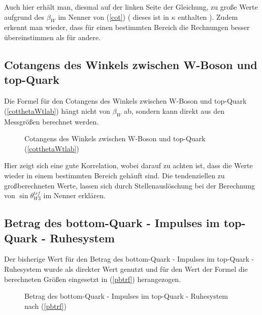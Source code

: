 \documentclass[
a4paper,                                %
twoside,                                %
BCOR1.4cm,                      %
ngerman,                                %
10pt,                           %
headings=normal,                %
headsepline,                    %
clearplainpage, %
final,                                  %
div=14,
parskip=full
]{scrbook}
\begin{document}
Auch hier erh\"alt man, diesmal auf der linken Seite der Gleichung, zu gro\ss e Werte aufgrund des $ \beta_{W} $ im Nenner von (\ref{cot}) ( dieses ist in $ \kappa $ enthalten ). Zudem erkennt man wieder, dass f\"ur einen bestimmten Bereich die Rechnungen besser \"ubereinstimmen als f\"ur andere.

\newpage

\subsection{Cotangens des Winkels zwischen W-Boson und top-Quark}

Die Formel f\"ur den Cotangens des Winkels zwischen W-Boson und top-Quark (\ref{cotthetaWtlab}) h\"angt nicht von $ \beta_{W} $ ab, sondern kann direkt aus den Messgr\"o\ss en berechnet werden.

\begin{figure}[h]
    \caption{Cotangens des Winkels zwischen W-Boson und top-Quark (\ref{cotthetaWtlab})}
    \label{cotthetaWtlabhist}
\end{figure}

Hier zeigt sich eine gute Korrelation, wobei darauf zu achten ist, dass die Werte wieder in einem bestimmten Bereich geh\"auft sind. Die tendenziellen zu gro\ss berechneten Werte, lassen sich durch Stellenausl\"oschung bei der Berechnung von $\textstyle \sin \theta_{W3}^{trf} $ im Nenner erkl\"aren.

\subsection{Betrag des bottom-Quark - Impulses im top-Quark - Ruhesystem}

Der bisherige Wert f\"ur den Betrag des bottom-Quark - Impulses im top-Quark - Ruhesystem wurde als direkter Wert genutzt und f\"ur den Wert der Formel die berechneten Gr\"o\ss en eingesetzt in (\ref{pbtrf}) herangezogen.

\begin{figure}[h]
    \caption{Betrag des bottom-Quark - Impulses im top-Quark - Ruhesystem nach (\ref{pbtrf})}
\end{figure}
\end{document}
